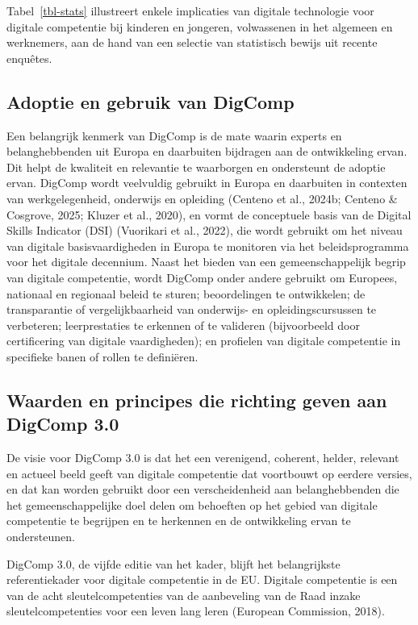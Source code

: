 \documentclass[
  dutch,
  letterpaper,
  DIV=11,
  numbers=noendperiod]{scrartcl}
\begin{document}
Tabel~\ref{tbl-stats} illustreert enkele implicaties van digitale
technologie voor digitale competentie bij kinderen en jongeren,
volwassenen in het algemeen en werknemers, aan de hand van een selectie
van statistisch bewijs uit recente enquêtes.

\subsection{Adoptie en gebruik van
DigComp}\label{sec-adoptie-en-gebruik-van-digcomp}

Een belangrijk kenmerk van DigComp is de mate waarin experts en
belanghebbenden uit Europa en daarbuiten bijdragen aan de ontwikkeling
ervan. Dit helpt de kwaliteit en relevantie te waarborgen en ondersteunt
de adoptie ervan. DigComp wordt veelvuldig gebruikt in Europa en
daarbuiten in contexten van werkgelegenheid, onderwijs en opleiding
(Centeno et al., 2024b; Centeno \& Cosgrove, 2025; Kluzer et al., 2020),
en vormt de conceptuele basis van de Digital Skills Indicator (DSI)
(Vuorikari et al., 2022), die wordt gebruikt om het niveau van digitale
basisvaardigheden in Europa te monitoren via het beleidsprogramma voor
het digitale decennium. Naast het bieden van een gemeenschappelijk
begrip van digitale competentie, wordt DigComp onder andere gebruikt om
Europees, nationaal en regionaal beleid te sturen; beoordelingen te
ontwikkelen; de transparantie of vergelijkbaarheid van onderwijs- en
opleidingscursussen te verbeteren; leerprestaties te erkennen of te
valideren (bijvoorbeeld door certificering van digitale vaardigheden);
en profielen van digitale competentie in specifieke banen of rollen te
definiëren.

\subsection{Waarden en principes die richting geven aan DigComp
3.0}\label{sec-waarden-en-principes}

De visie voor DigComp 3.0 is dat het een verenigend, coherent, helder,
relevant en actueel beeld geeft van digitale competentie dat voortbouwt
op eerdere versies, en dat kan worden gebruikt door een verscheidenheid
aan belanghebbenden die het gemeenschappelijke doel delen om behoeften
op het gebied van digitale competentie te begrijpen en te herkennen en
de ontwikkeling ervan te ondersteunen.

DigComp 3.0, de vijfde editie van het kader, blijft het belangrijkste
referentiekader voor digitale competentie in de EU. Digitale competentie
is een van de acht sleutelcompetenties van de aanbeveling van de Raad
inzake sleutelcompetenties voor een leven lang leren (European
Commission, 2018).
\end{document}

